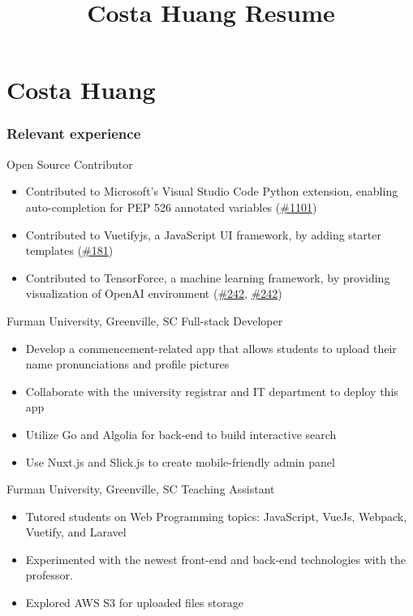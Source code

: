 \documentclass{tccv}
\title{Costa Huang Resume}
\begin{document}
\part{Costa Huang}

\section{Relevant experience}

\begin{eventlist}

     {}
     {Open Source Contributor}
\begin{itemize}
    \item Contributed to Microsoft's Visual Studio Code Python extension, enabling auto-completion for PEP 526 annotated variables (\href{https://github.com/DonJayamanne/pythonVSCode/issues/1101}{\#1101})
    \item Contributed to Vuetifyjs, a JavaScript UI  framework, by adding starter templates (\href{https://github.com/vuetifyjs/docs/pull/181}{\#181})
    \item Contributed to TensorForce, a machine learning framework, by providing visualization of \newline OpenAI environment (\href{https://github.com/reinforceio/tensorforce/pull/242}{\#242}, \href{https://github.com/reinforceio/tensorforce/pull/244}{\#242})
\end{itemize}

     {Furman University, Greenville, SC}
     {Full-stack Developer}
\begin{itemize}
    \item Develop a commencement-related app that allows students to 
upload their name pronunciations and profile pictures
    \item Collaborate with the university registrar and IT department to deploy this app
    \item Utilize Go and Algolia for back-end to build interactive
search
    \item Use Nuxt.js and Slick.js to create mobile-friendly admin panel
\end{itemize}

     {Furman University, Greenville, SC}
     {Teaching Assistant}
\begin{itemize}
    \item Tutored students on Web Programming topics: JavaScript, VueJs,
Webpack, Vuetify, and Laravel
    \item Experimented with the newest front-end and back-end
technologies with the professor.
    \item Explored AWS S3 for uploaded files storage
\end{itemize}


\end{eventlist}
\end{document}
